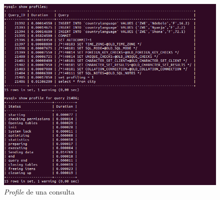 \begin{figure}[H]
	\centering
	\includegraphics[scale=0.6]{cuestion9-consulta.png}
	\caption{\textit{Profile} de una consulta} \label{cuestion9-consulta}
\end{figure}

\newpage



